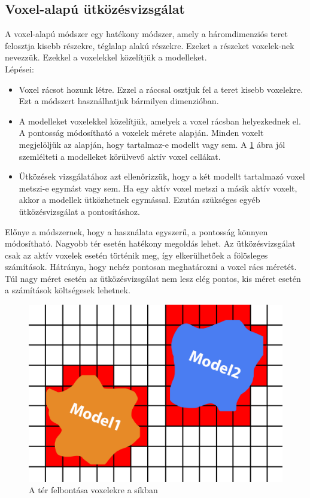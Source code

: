 \subsection{Voxel-alapú ütközésvizsgálat}
A voxel-alapú módszer egy hatékony módszer, amely a háromdimenziós teret felosztja kisebb részekre, téglalap alakú részekre. Ezeket a részeket voxelek-nek nevezzük.
Ezekkel a voxelekkel közelítjük a modelleket.
\\
Lépései:
\begin{itemize}
\item Voxel rácsot hozunk létre. Ezzel a ráccsal osztjuk fel a teret kisebb voxelekre. Ezt a módszert használhatjuk bármilyen dimenzióban.

\item A modelleket voxelekkel közelítjük, amelyek a voxel rácsban helyezkednek el. A pontosság módosítható a voxelek mérete alapján. Minden voxelt megjelöljük az alapján, hogy tartalmaz-e modellt vagy sem. A \ref{fig:con_3} ábra jól szemlélteti a modelleket körülvevő aktív voxel cellákat.

\item Ütközések vizsgálatához azt ellenőrizzük, hogy a két modellt tartalmazó voxel metszi-e egymást vagy sem. Ha egy aktív voxel metszi a másik aktív voxelt, akkor a modellek ütközhetnek egymással. Ezután szükséges egyéb ütközésvizsgálat a pontosításhoz.
\end{itemize}
Előnye a módszernek, hogy a használata egyszerű, a pontosság könnyen módosítható. Nagyobb tér esetén hatékony megoldás lehet. Az ütközésvizsgálat csak az aktív voxelek esetén történik meg, így elkerülhetőek a fölösleges számítások. Hátránya, hogy nehéz pontosan meghatározni a voxel rács méretét. Túl nagy méret esetén az ütközésvizsgálat nem lesz elég pontos, kis méret esetén a számítások költségesek lehetnek.
\begin{figure}[h]
	\centering
	\includegraphics[width=13truecm, height=7.5truecm]{images/con3.png}
	\caption{A tér felbontása voxelekre a síkban}
	\label{fig:con_3}
\end{figure}

